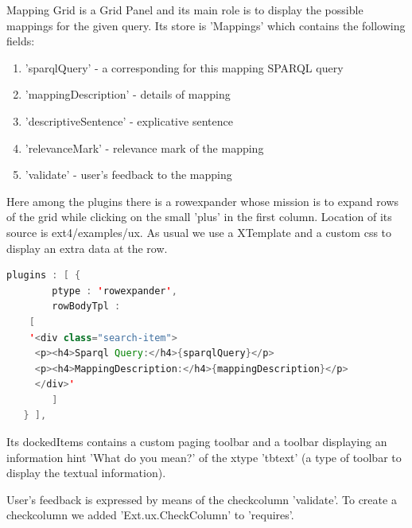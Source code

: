 \par Mapping Grid is a Grid Panel and its main role is to display the possible mappings for the given query. Its store is  'Mappings' which contains the following fields: 
   \begin{enumerate}
   	\item 'sparqlQuery' - a corresponding for this mapping SPARQL query
	\item 'mappingDescription' - details of mapping
	\item 'descriptiveSentence' - explicative sentence
	\item 'relevanceMark' - relevance mark of the mapping
	\item 'validate' - user's feedback to the mapping 
   \end{enumerate}
Here among the plugins  there is a rowexpander whose mission is to expand rows of the grid while clicking on the small 'plus' in the first column. Location of its source is  ext4/examples/ux. As usual we use a XTemplate and a custom css to display an extra data at the row. \\
\begin{lstlisting}[language=Java]
   plugins : [ {
        ptype : 'rowexpander',
        rowBodyTpl :
	[
	'<div class="search-item">
	 <p><h4>Sparql Query:</h4>{sparqlQuery}</p>
	 <p><h4>MappingDescription:</h4>{mappingDescription}</p>
	 </div>'
        ]
   } ],
\end{lstlisting}
\par Its dockedItems contains a custom paging toolbar and a toolbar displaying an information hint 'What do you mean?' of the xtype 'tbtext' (a type of toolbar to display the textual information). \\
\par User's feedback is expressed by means of the checkcolumn 'validate'. To create a checkcolumn we added 'Ext.ux.CheckColumn' to 'requires'.\\

